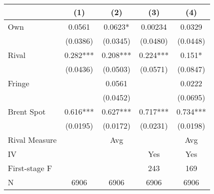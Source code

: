 {
\def\sym#1{\ifmmode^{#1}\else\(^{#1}\)\fi}
\begin{tabular}{l*{4}{c}}
\toprule
                &\multicolumn{1}{c}{(1)}   &\multicolumn{1}{c}{(2)}   &\multicolumn{1}{c}{(3)}   &\multicolumn{1}{c}{(4)}   \\
\midrule
Own             &   0.0561   &   0.0623*  &  0.00234   &   0.0329   \\
                & (0.0386)   & (0.0345)   & (0.0480)   & (0.0448)   \\
\addlinespace
Rival           &    0.282***&    0.208***&    0.224***&    0.151*  \\
                & (0.0436)   & (0.0503)   & (0.0571)   & (0.0847)   \\
\addlinespace
Fringe          &            &   0.0561   &            &   0.0222   \\
                &            & (0.0452)   &            & (0.0695)   \\
\addlinespace
Brent Spot      &    0.616***&    0.627***&    0.717***&    0.734***\\
                & (0.0195)   & (0.0172)   & (0.0231)   & (0.0198)   \\
\midrule
Rival Measure   &            &      Avg   &            &      Avg   \\
IV              &            &            &      Yes   &      Yes   \\
First-stage F   &            &            &      243   &      169   \\
N               &     6906   &     6906   &     6906   &     6906   \\
\bottomrule
\end{tabular}
}
